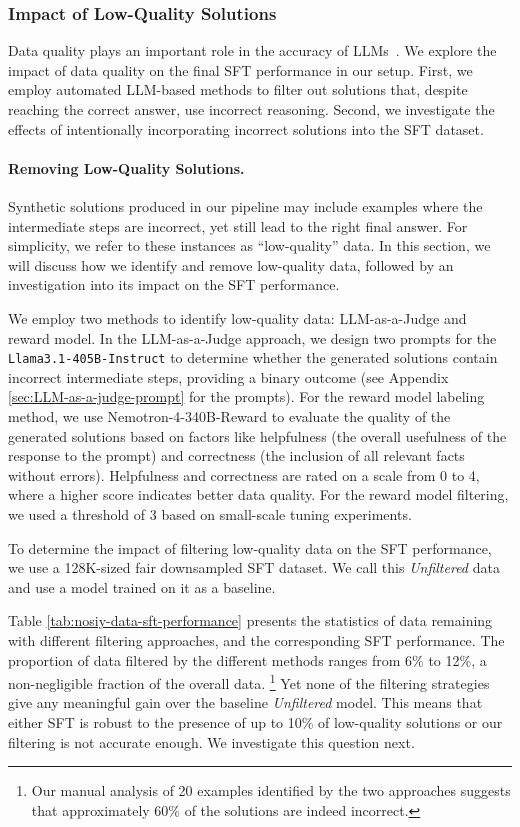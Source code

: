 \subsubsection{Impact of Low-Quality Solutions}
\label{sec:impact-of-noise}



Data quality plays an important role in the accuracy of LLMs~\citep{jain2024llmassisted}.  
We explore the impact of data quality on the final SFT performance in our setup. 
First, we employ automated LLM-based methods to filter out solutions that, despite reaching the correct answer, use incorrect reasoning. Second, we investigate the effects of intentionally incorporating incorrect solutions into the SFT dataset.


\paragraph{Removing Low-Quality Solutions.}
Synthetic solutions produced in our pipeline may include examples where the intermediate steps are incorrect, yet still lead to the right final answer.
For simplicity, we refer to these instances as ``low-quality'' data.  In this section, we will discuss how we identify and remove low-quality data, followed by an investigation into its impact on the SFT performance.

We employ two methods to identify low-quality data: LLM-as-a-Judge and reward model. In the LLM-as-a-Judge approach, we design two  prompts for the \texttt{Llama3.1-405B-Instruct} to determine whether the generated solutions contain incorrect intermediate steps, providing a binary outcome (see Appendix \ref{sec:LLM-as-a-judge-prompt} for the prompts). For the reward model labeling method, we use Nemotron-4-340B-Reward \citep{wang2024helpsteer2} to evaluate the quality of the generated solutions based on factors like helpfulness (the overall usefulness of the response to the prompt) and correctness (the inclusion of all relevant facts without errors). Helpfulness and correctness are rated on a scale from 0 to 4, where a higher score indicates better data quality. For the reward model filtering, we used a threshold of 3 based on small-scale tuning experiments. 

To determine the impact of filtering low-quality data on the SFT performance, we use a 128K-sized fair downsampled SFT dataset. 
We call this \emph{Unfiltered} data and use a model trained on it as a baseline. 


Table \ref{tab:nosiy-data-sft-performance} presents the statistics of data remaining with different filtering approaches, and the corresponding SFT performance. 
The proportion of data filtered by the different methods ranges from 6\% to 12\%, a non-negligible fraction of the overall data. \footnote{Our manual analysis of 20 examples identified by the two approaches suggests that approximately 60\% of the solutions are indeed incorrect.}
Yet none of the filtering strategies give any meaningful gain over the baseline \emph{Unfiltered} model. 
This means that either SFT is robust to the presence of up to 10\% of low-quality solutions or our filtering is not accurate enough. We investigate this question next.


